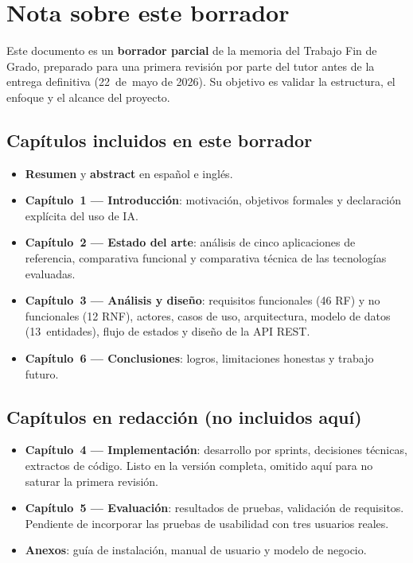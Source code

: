 \chapter*{Nota sobre este borrador}

Este documento es un \textbf{borrador parcial} de la memoria del Trabajo Fin de Grado, preparado para una primera revisión por parte del tutor antes de la entrega definitiva (22~de~mayo de 2026). Su objetivo es validar la estructura, el enfoque y el alcance del proyecto.

\section*{Capítulos incluidos en este borrador}

\begin{itemize}
  \item \textbf{Resumen} y \textbf{abstract} en español e inglés.
  \item \textbf{Capítulo~1 — Introducción}: motivación, objetivos formales y declaración explícita del uso de IA.
  \item \textbf{Capítulo~2 — Estado del arte}: análisis de cinco aplicaciones de referencia, comparativa funcional y comparativa técnica de las tecnologías evaluadas.
  \item \textbf{Capítulo~3 — Análisis y diseño}: requisitos funcionales (46 RF) y no funcionales (12 RNF), actores, casos de uso, arquitectura, modelo de datos (13~entidades), flujo de estados y diseño de la API REST.
  \item \textbf{Capítulo~6 — Conclusiones}: logros, limitaciones honestas y trabajo futuro.
\end{itemize}

\section*{Capítulos en redacción (no incluidos aquí)}

\begin{itemize}
  \item \textbf{Capítulo~4 — Implementación}: desarrollo por sprints, decisiones técnicas, extractos de código. Listo en la versión completa, omitido aquí para no saturar la primera revisión.
  \item \textbf{Capítulo~5 — Evaluación}: resultados de pruebas, validación de requisitos. Pendiente de incorporar las pruebas de usabilidad con tres usuarios reales.
  \item \textbf{Anexos}: guía de instalación, manual de usuario y modelo de negocio.
\end{itemize}

